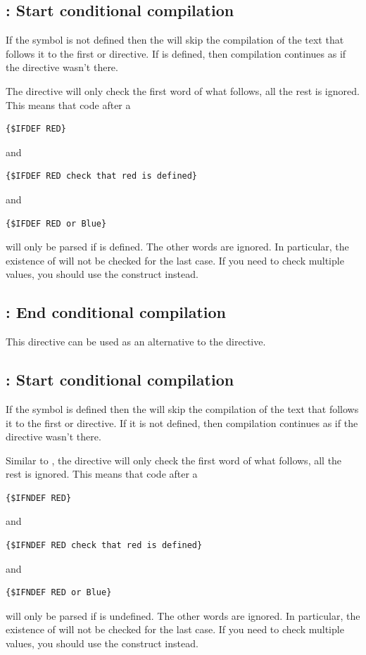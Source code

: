 \subsection{ : Start conditional compilation}

If the symbol  is not defined then the 
will skip the compilation of the text that follows it to the first
 or  directive.
If  is defined, then compilation continues as if the directive
wasn't there.

The  directive will only check the first word of what follows,
all the rest is ignored. This means that code after a
\begin{verbatim}
{$IFDEF RED}
\end{verbatim}
and
\begin{verbatim}
{$IFDEF RED check that red is defined}
\end{verbatim}
and
\begin{verbatim}
{$IFDEF RED or Blue}
\end{verbatim}
will only be parsed if  is defined. The other words are ignored. In
particular, the existence of  will not be checked for the last case. 
If you need to check multiple values, you should use the  construct instead.

\subsection{ : End conditional compilation}
This directive can be used as an alternative to the  directive. 

\subsection{ : Start conditional compilation}

If the symbol  is defined then the 
will skip the compilation of the text that follows it to the first
 or  directive.
If it is not defined, then compilation continues as if the directive
wasn't there.

Similar to , the   directive will only check the first word of what follows,
all the rest is ignored. This means that code after a
\begin{verbatim}
{$IFNDEF RED}
\end{verbatim}
and
\begin{verbatim}
{$IFNDEF RED check that red is defined}
\end{verbatim}
and
\begin{verbatim}
{$IFNDEF RED or Blue}
\end{verbatim}
will only be parsed if  is undefined. The other words are ignored. In
particular, the existence of  will not be checked for the last case. 
If you need to check multiple values, you should use the  construct instead.


